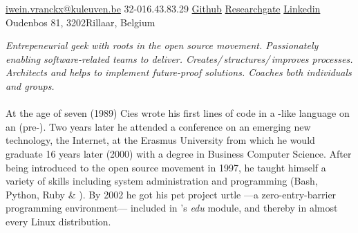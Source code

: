 \documentclass[10pt,a4paper]{article}
\begin{document}
\sloppy  %



\nobreakvspace{0.3em}  %

\noindent\href{mailto:ivranckx.at.kuleuven.dot.be}{\faInbox \; iwein.vranckx\mbox{}@\mbox{}kuleuven.be}\sbull
\faWhatsapp \; \textsmaller{+}32-016.43.83.29\sbull
\href{https://github.com/ivranckx}{\faGithub \; Github}\sbull
\href{https://www.researchgate.net/profile/Iwein_Vranckx}{\faPaperclip \; Researchgate}\sbull
\href{http://linkedin.com/in/ivranckx}{\faLinkedin \; Linkedin}
\\
\faMapMarker \; Oudenbos  81, 
3202\thinspace Rillaar, Belgium\sbull%

\spacedhrule{0.9em}{-0.4em}  %


\vspace{-1.3em}  %

\begin{multicols}{2}  %
\noindent \emph{Entrepeneurial geek with roots in the open source movement. Passionately enabling software-related teams to deliver. Creates/\,structures/\,improves processes. Architects and helps to implement future-proof solutions. Coaches both individuals and groups.}
\\
\\
At the age of seven (1989) Cies wrote his first lines of code in a -like language on an  (pre-).  Two years later he attended a conference on an emerging new technology, the Internet, at the Erasmus University from which he would graduate 16 years later (2000) with a degree in Business Computer Science.
After being introduced to the open source movement in 1997, he taught himself a variety of skills including system administration and programming (Bash, Python, Ruby \& \CPP).  By 2002 he got his pet project urtle ---a zero-entry-barrier programming environment--- included in 's \emph{edu} module, and thereby in almost every Linux distribution.
\end{multicols}
\end{document}
